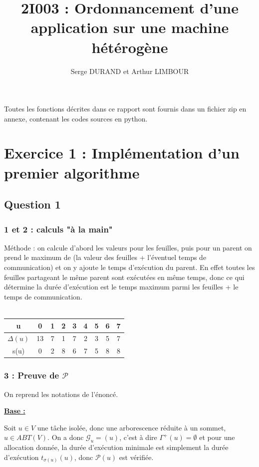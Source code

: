 \documentclass{article}
\title{2I003 : Ordonnancement d'une application sur une machine hétérogène}
\author{Serge DURAND et Arthur LIMBOUR}
\begin{document}
\maketitle
Toutes les fonctions décrites dans ce rapport sont fournis dans un fichier zip en annexe, contenant les codes sources en python.
\section{Exercice 1 : Implémentation d'un premier algorithme}

\subsection{Question 1}
\subsubsection{1 et 2 : calculs "à la main"}
Méthode : on calcule d'abord les valeurs pour les feuilles, puis pour un parent on prend le maximum de (la valeur des feuilles + l'éventuel temps de communication) et on y ajoute le temps d'exécution du parent. En effet toutes les feuilles partageant le même parent sont exécutées en même temps, donc ce qui détermine la durée d'exécution est le temps maximum parmi les feuilles + le temps de communication.\\ \\
\begin{tabular}{|c|c|c|c|c|c|c|c|c|}
  \hline
  u & 0 & 1 & 2 & 3 & 4 & 5 & 6 & 7 \\
  \hline
  $\Delta(u)$ & 13 & 7 & 1 & 7 & 2 & 3 & 5 & 7 \\
  \hline
  s(u) & 0 & 2 & 8 & 6 & 7 & 5 & 8 & 8\\
  \hline
\end{tabular}
\subsubsection{3 : Preuve de $\mathcal{P}$}
On reprend les notations de l'énoncé.
\begin{flushleft}
    \bf
    \underline{Base :}
\end{flushleft}

Soit $u \in V$ une tâche isolée, donc une arborescence réduite à un sommet, $u \in ABT(V)$. On a donc $\mathcal{G}_u = (u)$, c'est à dire $\Gamma^{+}(u) = \emptyset$ et pour une allocation donnée, la durée d'exécution minimale est simplement la durée d'exécution $t_{\sigma(u)}(u)$, donc $\mathcal{P}(u)$ est vérifiée.
\end{document}
